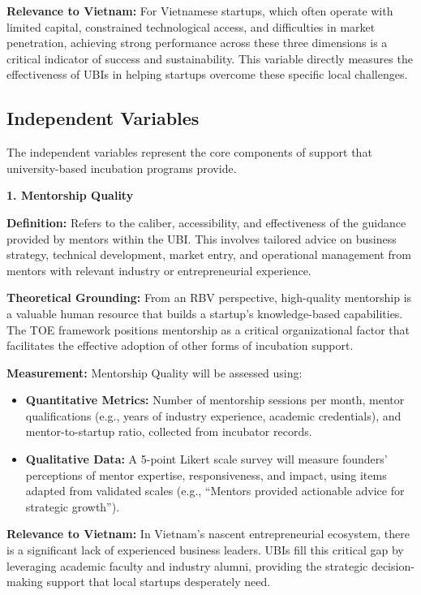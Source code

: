 \documentclass[../Main.tex]{subfiles}
\begin{document}
    \textbf{Relevance to Vietnam:} For Vietnamese startups, which often operate with limited capital, constrained technological access, and difficulties in market penetration, achieving strong performance across these three dimensions is a critical indicator of success and sustainability. This variable directly measures the effectiveness of UBIs in helping startups overcome these specific local challenges.

    \subsection{Independent Variables}
    
    The independent variables represent the core components of support that university-based incubation programs provide.
    
    \textbf{1. Mentorship Quality}
    
    \textbf{Definition:} Refers to the caliber, accessibility, and effectiveness of the guidance provided by mentors within the UBI. This involves tailored advice on business strategy, technical development, market entry, and operational management from mentors with relevant industry or entrepreneurial experience.
    
    \textbf{Theoretical Grounding:} From an RBV perspective, high-quality mentorship is a valuable human resource that builds a startup's knowledge-based capabilities. The TOE framework positions mentorship as a critical organizational factor that facilitates the effective adoption of other forms of incubation support.
    
    \textbf{Measurement:} Mentorship Quality will be assessed using:
    \begin{itemize}
        \item \textbf{Quantitative Metrics:} Number of mentorship sessions per month, mentor qualifications (e.g., years of industry experience, academic credentials), and mentor-to-startup ratio, collected from incubator records.
        \item \textbf{Qualitative Data:} A 5-point Likert scale survey will measure founders' perceptions of mentor expertise, responsiveness, and impact, using items adapted from validated scales (e.g., ``Mentors provided actionable advice for strategic growth'').
    \end{itemize}
    
    \textbf{Relevance to Vietnam:} In Vietnam's nascent entrepreneurial ecosystem, there is a significant lack of experienced business leaders. UBIs fill this critical gap by leveraging academic faculty and industry alumni, providing the strategic decision-making support that local startups desperately need.
    
\end{document}
